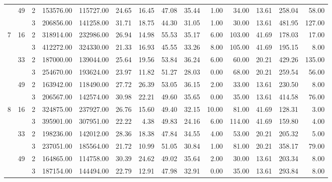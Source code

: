 \begin{tabular}{lllrrrrrrrrrrr}
\cline{2-14}
  & \multirow{2}{*}{49} & 2 & 153576.00 & 115727.00 & 24.65 &   16.45 &   47.08 &   35.44 &    1.00 &   34.00 &   13.61 & 258.04 &    58.00 \\
  &    & 3 & 206856.00 & 141258.00 & 31.71 &   18.75 &   44.30 &   31.05 &    1.00 &   30.00 &   13.61 & 481.95 &   127.00 \\
\cline{1-14}
\cline{2-14}
\multirow{6}{*}{7} & \multirow{2}{*}{16} & 2 & 318914.00 & 232986.00 & 26.94 &   14.98 &   55.53 &   35.17 &    6.00 &  103.00 &   41.69 & 178.03 &    17.00 \\
  &    & 3 & 412272.00 & 324330.00 & 21.33 &   16.93 &   45.55 &   33.26 &    8.00 &  105.00 &   41.69 & 195.15 &     8.00 \\
\cline{2-14}
  & \multirow{2}{*}{33} & 2 & 187000.00 & 139044.00 & 25.64 &   19.56 &   53.84 &   36.24 &    6.00 &   60.00 &   20.21 & 429.26 &   135.00 \\
  &    & 3 & 254670.00 & 193624.00 & 23.97 &   11.82 &   51.27 &   28.03 &    0.00 &   68.00 &   20.21 & 259.54 &    56.00 \\
\cline{2-14}
  & \multirow{2}{*}{49} & 2 & 163942.00 & 118490.00 & 27.72 &   26.39 &   53.05 &   36.15 &    2.00 &   33.00 &   13.61 & 230.50 &     8.00 \\
  &    & 3 & 206567.00 & 142574.00 & 30.98 &   22.21 &   49.60 &   35.65 &    0.00 &   35.00 &   13.61 & 414.58 &    76.00 \\
\cline{1-14}
\cline{2-14}
\multirow{6}{*}{8} & \multirow{2}{*}{16} & 2 & 324875.00 & 237927.00 & 26.76 &   15.60 &   49.40 &   32.15 &   10.00 &   81.00 &   41.69 & 128.31 &     3.00 \\
  &    & 3 & 395901.00 & 307951.00 & 22.22 &    4.38 &   49.83 &   24.16 &    6.00 &  114.00 &   41.69 & 159.80 &     4.00 \\
\cline{2-14}
  & \multirow{2}{*}{33} & 2 & 198236.00 & 142012.00 & 28.36 &   18.38 &   47.84 &   34.55 &    4.00 &   53.00 &   20.21 & 205.32 &     5.00 \\
  &    & 3 & 237051.00 & 185564.00 & 21.72 &   10.99 &   51.05 &   30.84 &    1.00 &   81.00 &   20.21 & 358.17 &    79.00 \\
\cline{2-14}
  & \multirow{2}{*}{49} & 2 & 164865.00 & 114758.00 & 30.39 &   24.62 &   49.02 &   35.64 &    2.00 &   30.00 &   13.61 & 203.34 &     8.00 \\
  &    & 3 & 187154.00 & 144494.00 & 22.79 &   12.91 &   47.98 &   32.91 &    0.00 &   35.00 &   13.61 & 293.84 &     8.00 \\
\cline{1-14}

\end{tabular}
